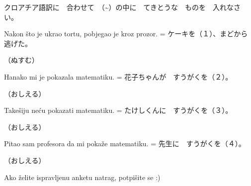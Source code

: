 	\begin{mondai}{クロアチア語訳に　合わせて　（\textasciitilde）の中に　てきとうな　ものを　入れなさい。}
		\item Nakon što je ukrao tortu, pobjegao je kroz prozor. = ケーキを（１）、まどから逃げた。
		
		（ぬすむ）
		\item Hanako mi je pokazala matematiku. = 花子ちゃんが　すうがくを（２）。
		
		（おしえる）
		\item Takešiju neću pokazati matematiku. = たけしくんに　すうがくを（３）。
		
		（おしえる）
		\item Pitao sam profesora da mi pokaže matematiku. = 先生に　すうがくを（４）。
		
		（おしえる）
	\end{mondai}

	Ako želite ispravljenu anketu natrag, potpišite se :)
